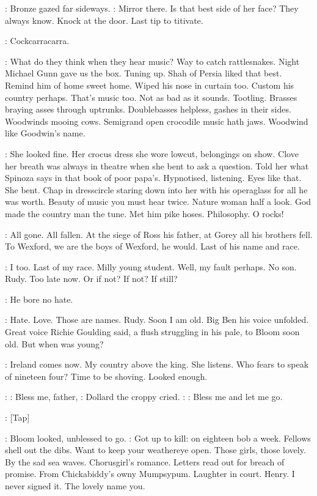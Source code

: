 :
Bronze gazed far sideways.
\BloomInt:
Mirror there. Is that best side of her face?
They always know. Knock at the door. Last tip to titivate.

\BloomInt:
Cockcarracarra.

\BloomInt:
What do they think when they hear music? Way to catch rattlesnakes.
Night Michael Gunn gave us the box.
Tuning up. Shah of Persia liked that
best. Remind him of home sweet home. Wiped his nose in curtain too.
Custom his country perhaps. That's music too. Not as bad as it sounds.
Tootling. Brasses braying asses through uptrunks. Doublebasses helpless,
gashes in their sides. Woodwinds mooing cows. Semigrand open crocodile
music hath jaws. Woodwind like Goodwin's name.

\BloomInt:
She looked fine. Her crocus dress she wore lowcut, belongings on
show. Clove her breath was always in theatre when she bent to ask a
question. Told her what Spinoza says in that book of poor papa's.
Hypnotised, listening. Eyes like that. She bent. Chap in dresscircle
staring down into her with his operaglass for all he was worth.
Beauty of music you must hear twice. Nature woman half a look. God made the
country man the tune. Met him pike hoses. Philosophy. O rocks!

\BloomInt:
All gone. All fallen. At the siege of Ross his father, at Gorey all his
brothers fell. To Wexford, we are the boys of Wexford, he would. Last of
his name and race.

\BloomInt:
I too. Last of my race. Milly young student. Well, my fault perhaps.
No son. Rudy. Too late now. Or if not? If not? If still?

\BloomInt:
He bore no hate.

\BloomInt:
Hate. Love. Those are names. Rudy. Soon I am old. Big Ben his voice
unfolded.
Great voice Richie Goulding said, a flush struggling in his
pale, to Bloom soon old. But when was young?

\BloomInt:
Ireland comes now. My country above the king. She listens. Who
fears to speak of nineteen four? Time to be shoving. Looked enough.

\Dollard:
 \Song:
Bless me, father,
:
Dollard the croppy cried.
\Dollard:
 \Song:
Bless me and let me go.

\Stripling:
[Tap]

:
Bloom looked, unblessed to go.
\BloomInt:
Got up to kill: on eighteen bob a
week. Fellows shell out the dibs. Want to keep your weathereye open. Those
girls, those lovely. By the sad sea waves. Chorusgirl's romance. Letters
read out for breach of promise. From Chickabiddy's owny Mumpsypum.
Laughter in court.
Henry. I never signed it. The lovely name you.

